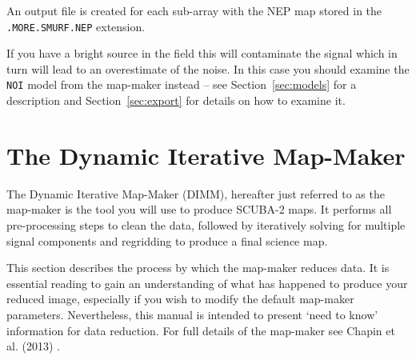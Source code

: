 \documentclass[twoside,11pt]{article}
\newcommand{\htmlref}[2]{#1}
\newcommand{\latexhtml}[2]{#1}
\newcommand{\xlabel}[1]{}
\renewcommand{\_}{\texttt{\symbol{95}}}
\newcommand{\cref}[3]{\latexhtml{#1~\ref{#2}}{\htmlref{#3}{#2}}}
\begin{document}
An output file is created for each sub-array with the NEP map stored
in the \texttt{.MORE.SMURF.NEP} extension.

If you have a bright source in the field this will contaminate the
signal which in turn will lead to an overestimate of the noise. In
this case you should examine the \texttt{NOI} model from the map-maker
instead -- see \cref{Section}{sec:models}{The Individual Models} for a
description and \cref{Section}{sec:export}{Exporting individual
models} for details on how to examine it.

\clearpage
\section{\xlabel{dimm}The Dynamic Iterative Map-Maker}
\label{sec:dimm}

The Dynamic Iterative Map-Maker (DIMM), hereafter just referred to as
the map-maker is the tool you will use to produce SCUBA-2 maps. It
performs all pre-processing steps to clean the data, followed by
iteratively solving for multiple signal components and regridding to
produce a final science map.

This section describes the process by which the map-maker reduces
data. It is essential reading to gain an understanding of what has
happened to produce your reduced image, especially if you wish to
modify the default map-maker parameters. Nevertheless, this manual
is intended to present `need to know' information for data reduction.
For full details of the map-maker see Chapin et al. (2013) \cite{mapmaker}.
\end{document}
